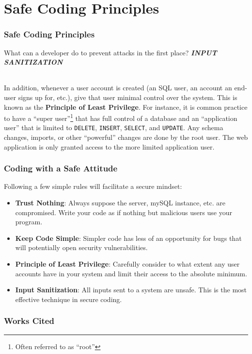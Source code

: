 \documentclass[aspectratio=169]{beamer}
\begin{document}
\section{Safe Coding Principles}
\begin{frame}
\frametitle{Safe Coding Principles}
What can a developer do to prevent attacks in the first place?
\pause
\textbf{\emph{INPUT SANITIZATION}}

\pause
\mbox{}\\
In addition, whenever a user account is created (an SQL user, an account an end-user signs up for, etc.), give that user minimal control over the system. This is known as the \textbf{Principle of Least Privilege}. \cite{owasp} For instance, it is common practice to have a ``super user''\footnote{Often referred to as ``root''} that has full control of a database and an ``application user'' that is limited to \texttt{DELETE}, \texttt{INSERT}, \texttt{SELECT}, and \texttt{UPDATE}. Any schema changes, imports, or other ``powerful'' changes are done by the root user. The web application is only granted access to the more limited application user.
\end{frame}

\begin{frame}
\frametitle{Coding with a Safe Attitude}
Following a few simple rules will facilitate a secure mindset:
\begin{itemize}
	\item \textbf{Trust Nothing}: Always suppose the server, mySQL instance, etc. are compromised. Write your code as if nothing but malicious users use your program.
	\item \textbf{Keep Code Simple}: Simpler code has less of an opportunity for bugs that will potentially open security vulnerabilities.
	\item \textbf{Principle of Least Privilege}: Carefully consider to what extent any user accounts have in your system and limit their access to the absolute minimum.
	\item \textbf{Input Sanitization}: All inputs sent to a system are unsafe. This is the most effective technique in secure coding.
\end{itemize}
\end{frame}

\begin{frame}[allowframebreaks]
\frametitle{Works Cited}

\end{frame}
\end{document}
